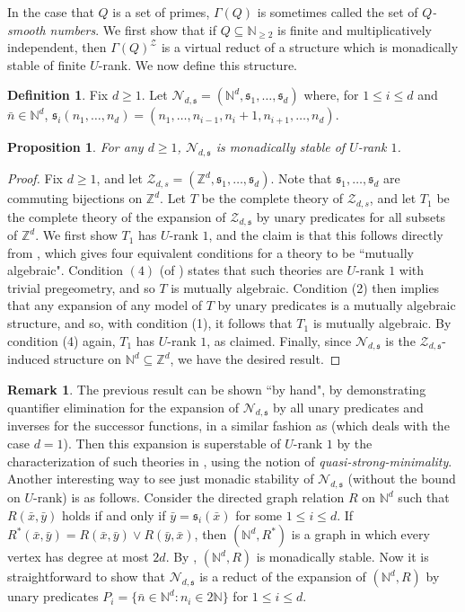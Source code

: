\documentclass{amsart}
\def\seq{\subseteq}
\newcommand{\nbar}{\bar{n}}
\newcommand{\xbar}{\bar{x}}
\newcommand{\ybar}{\bar{y}}
\newcommand{\ms}{\mathfrak{s}}
\newcommand{\cN}{\mathcal{N}}
\newcommand{\cZ}{\mathcal{Z}}
\def\N{\mathbb N}
\def\Z{\mathbb Z}
\newtheorem{proposition}[theorem]{Proposition}
\theoremstyle{definition}
\newtheorem{definition}[theorem]{Definition}
\newtheorem{remark}[theorem]{Remark}
\begin{document}
In the case that $Q$ is a set of primes, $\Gamma(Q)$ is sometimes called the set of \emph{$Q$-smooth numbers}. We first show that if $Q\seq\N_{\geq 2}$ is finite and multiplicatively independent, then $\Gamma(Q)^{\cZ}$ is a virtual reduct of a structure which is monadically stable of finite $U$-rank. We now define this structure.


\begin{definition}
Fix $d\geq 1$. Let $\cN_{d,\ms}=(\N^d,\ms_1,\ldots,\ms_d)$ where, for $1\leq i\leq d$ and $\nbar\in\N^d$, $\ms_i(n_1,\ldots,n_d)=(n_1,\ldots,n_{i-1},n_i+1,n_{i+1},\ldots,n_d)$.
\end{definition}



\begin{proposition}\label{prop:monstab}
For any $d\geq 1$, $\cN_{d,\ms}$ is monadically stable of $U$-rank $1$.
\end{proposition}
\begin{proof}
Fix $d\geq 1$, and let $\cZ_{d,s}=(\Z^d,\ms_1,\ldots,\ms_d)$. Note that $\ms_1,\ldots,\ms_d$ are commuting bijections on $\Z^d$. Let $T$ be the complete theory of $\cZ_{d,s}$, and let $T_1$ be the complete theory of the expansion of $\cZ_{d,\ms}$ by unary predicates for all subsets of $\Z^d$. We first show $T_1$ has $U$-rank $1$, and the claim is that this follows directly from \cite[Theorem 3.3]{LaskMAS}, which gives four equivalent conditions for a theory to be  ``mutually algebraic". Condition $(4)$  (of \cite[Theorem 3.3]{LaskMAS}) states that such theories are $U$-rank $1$ with trivial pregeometry, and so $T$ is mutually algebraic. Condition (2) then implies that any expansion of any model of $T$ by unary predicates is a mutually algebraic structure, and so, with condition (1), it follows that $T_1$ is mutually algebraic. By condition (4) again, $T_1$ has $U$-rank $1$, as claimed. Finally, since $\cN_{d,\ms}$ is the $\cZ_{d,\ms}$-induced structure on $\N^d\seq\Z^d$, we have the desired result.   
\end{proof}

\begin{remark}
The previous result can be shown ``by hand", by demonstrating quantifier elimination for the expansion of $\cN_{d,\ms}$ by all unary predicates and inverses for the successor functions, in a similar fashion as \cite[Proposition 5.9]{CoSS} (which deals with the case $d=1$). Then this expansion is superstable of $U$-rank $1$ by the characterization of such theories in \cite[Theorem 21]{BPW}, using the notion of \emph{quasi-strong-minimality}. Another interesting way to see just monadic stability of $\cN_{d,\ms}$ (without the bound on $U$-rank) is as follows. Consider the directed graph relation $R$ on $\N^d$ such that $R(\xbar,\ybar)$ holds if and only if $\ybar=\ms_i(\xbar)$ for some $1\leq i\leq d$. If $R^*(\xbar,\ybar)=R(\xbar,\ybar)\vee R(\ybar,\xbar)$, then $(\N^d,R^*)$ is a graph in which every vertex has degree at most $2d$. By \cite[Theorem 1.4]{IvSF}, $(\N^d,R)$ is monadically stable. Now it is straightforward to show that $\cN_{d,\ms}$ is a reduct of the expansion of $(\N^d,R)$ by unary predicates $P_i=\{\nbar\in\N^d:n_i\in 2\N\}$ for $1\leq i\leq d$. 
\end{remark}
\end{document}
